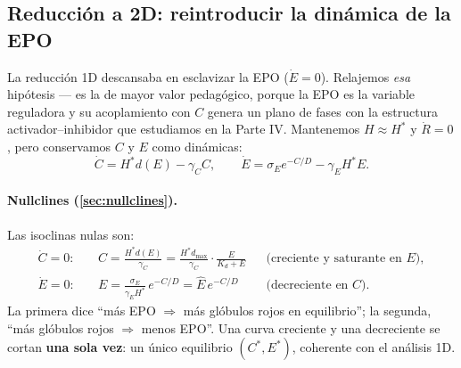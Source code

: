 \subsection{Reducción a 2D: reintroducir la dinámica de la EPO}
\label{sec:eritro_2d}

La reducción 1D descansaba en esclavizar la EPO ($\dot E=0$). Relajemos \emph{esa} hipótesis --- es la de mayor valor pedagógico, porque la EPO es la variable reguladora y su acoplamiento con $C$ genera un plano de fases con la estructura activador--inhibidor que estudiamos en la Parte IV. Mantenemos $H\approx H^*$ y $\dot R=0$, pero conservamos $C$ y $E$ como dinámicas:
\begin{equation}
    \dot{C} = H^* d(E) - \gamma_C C, \qquad
    \dot{E} = \sigma_E e^{-C/D} - \gamma_E H^* E.
    \label{eq:eritro_2d}
\end{equation}

\paragraph{Nullclines (\cref{sec:nullclines}).} Las isoclinas nulas son:
\begin{align}
    \dot C = 0:\quad & C = \frac{H^* d(E)}{\gamma_C} = \frac{H^* d_{\max}}{\gamma_C}\cdot\frac{E}{K_d+E} && \text{(creciente y saturante en } E),\\
    \dot E = 0:\quad & E = \frac{\sigma_E}{\gamma_E H^*}\,e^{-C/D} = \hat E\,e^{-C/D} && \text{(decreciente en } C).
\end{align}
La primera dice ``más EPO $\Rightarrow$ más glóbulos rojos en equilibrio''; la segunda, ``más glóbulos rojos $\Rightarrow$ menos EPO''. Una curva creciente y una decreciente se cortan \textbf{una sola vez}: un único equilibrio $(C^*,E^*)$, coherente con el análisis 1D.

